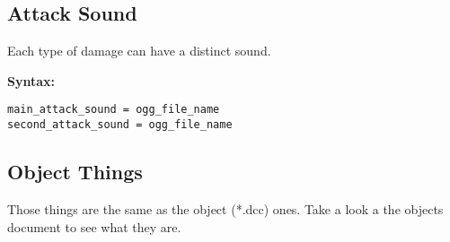 \documentclass[letterpaper,12pt]{article}
\begin{document}
\subsection{Attack Sound}

Each type of damage can have a distinct sound.

{\bf Syntax:}
\begin{verbatim}
main_attack_sound = ogg_file_name
second_attack_sound = ogg_file_name
\end{verbatim}

\subsection{Object Things}
Those things are the same as the object (*.dcc) ones. Take a look a the objects document to see what they are.
\end{document}

